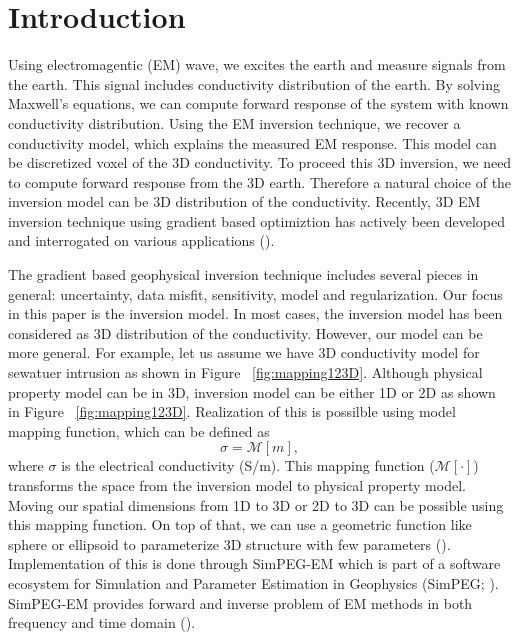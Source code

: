 \documentclass{segabs}
\begin{document}
\section{Introduction}
Using electromagentic (EM) wave, we excites the earth and measure signals from the earth. This signal includes conductivity distribution of the earth. By solving Maxwell's equations, we can compute forward response of the system with known conductivity distribution.
Using the EM inversion technique, we recover a conductivity model, which explains the measured EM response.
This model can be discretized voxel of the 3D conductivity.
To proceed this 3D inversion, we need to compute forward response from the 3D earth. Therefore a natural choice of the inversion model can be 3D distribution of the conductivity.
Recently, 3D EM inversion technique using gradient based optimiztion has actively been developed and interrogated on various applications (\cite{Doug2013,Gribenko2007,Chung2014}).

The gradient based geophysical inversion technique includes several pieces in general: uncertainty, data misfit, sensitivity, model and regularization. Our focus in this paper is the inversion model.
In most cases, the inversion model has been considered as 3D distribution of the conductivity.
However, our model can be more general. For example, let us assume we have 3D conductivity model for sewatuer intrusion as shown in Figure ~\ref{fig:mapping123D}. Although physical property model can be in 3D, inversion model can be either 1D or 2D as shown in Figure ~\ref{fig:mapping123D}. Realization of this is possilble using model mapping function, which can be defined as
\begin{equation}
  \sigma  = \mathcal{M}[m],
\end{equation}
where $\sigma$ is the electrical conductivity (S/m). This mapping function ($\mathcal{M}[\cdot]$) transforms the space from the inversion model to physical property model. Moving our spatial dimensions from 1D to 3D or 2D to 3D can be possible using this mapping function. On top of that, we can use a geometric function like sphere or ellipsoid to parameterize 3D structure with few parameters (\cite{MikeParam2014}). Implementation of this is done through SimPEG-EM which is part of a software ecosystem for Simulation and Parameter Estimation in Geophysics (SimPEG; \cite{SimPEG}). SimPEG-EM provides forward and inverse problem of EM methods in both frequency and time domain (\cite{SimPEGEM}).
\end{document}

